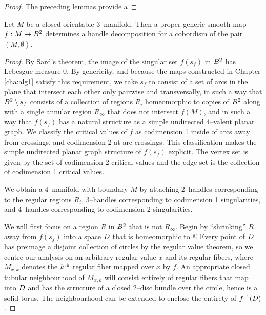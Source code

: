 \begin{proof}
	The preceding lemmas provide a
	
\end{proof}

\begin{theorem}

	Let $M$ be a closed orientable 3--manifold.
	Then a proper generic smooth map $f:M\to B^2$ determines a handle decomposition for a cobordism of the pair $(M,\emptyset)$.
\end{theorem}

\begin{proof}
	By Sard's theorem, the image of the singular set $f(s_f)$ in $B^2$ has Lebesgue measure 0.
	By genericity, and because the maps constructed in Chapter \ref{cha:alg1} satisfy this requirement, we take $s_f$ to consist of a set of arcs in the plane that intersect each other only pairwise and transversally, in such a way that $B^2\setminus s_f$ consists of a collection of regions $R_i$ homeomorphic to copies of $B^2$ along with a single annular region $R_\infty$ that does not intersect $f(M)$, and in such a way that $f(s_f)$ has a natural structure as a simple undirected 4--valent planar graph.
	We classify the critical values of $f$ as codimension 1 inside of arcs away from crossings, and codimension 2 at arc crossings.
	This classification makes the simple undirected planar graph structure of $f(s_f)$ explicit.
	The vertex set is given by the set of codimension 2 critical values and the edge set is the collection of codimension 1 critical values.
	
	We obtain a 4--manifold with boundary $M$ by attaching 2--handles corresponding to the regular regions $R_i$, 3--handles corresponding to codimension 1 singularities, and 4--handles corresponding to codimension 2 singularities.
	
	We will first focus on a region $R$ in $B^2$ that is not $R_\infty$.
	Begin by ``shrinking'' $R$ away from $f(s_f)$ into a space $D$ that is homeomorphic to $\DD$
	Every point of $D$ has preimage a disjoint collection of circles by the regular value theorem, so we centre our analysis on an arbitrary regular value $x$ and its regular fibers, where $M_{x,k}$ denotes the $k^{\text{th}}$ regular fiber mapped over $x$ by $f$.
	An appropriate closed tubular neighbourhood of $M_{x,k}$ will consist entirely of regular fibers that map into $D$ and has the structure of a closed 2--disc bundle over the circle, hence is a solid torus.
	The neighbourhood can be extended to enclose the entirety of $f^{\,\text{-}1}(D)$.
	

\end{proof}
